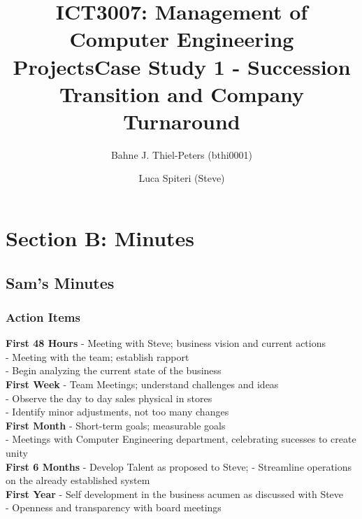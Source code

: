 \documentclass[a4paper,10pt]{article}
\title{ICT3007: Management of Computer Engineering Projects\newline \centering Case Study 1 - Succession Transition and Company Turnaround}
\author{
Bahne J. Thiel-Peters (bthi0001)
}
\begin{document}
\maketitle
\thispagestyle{empty}

\setcounter{page}{1}

\section{Section B: Minutes}

\subsection{Sam's Minutes}
\author{Luca Spiteri (Steve)}

\subsubsection{Action Items}
\textbf{First 48 Hours}
- Meeting with Steve; business vision and current actions \\
- Meeting with the team; establish rapport \\
- Begin analyzing the current state of the business \\

\textbf{First Week}
- Team Meetings; understand challenges and ideas \\
- Observe the day to day sales physical in stores \\
- Identify minor adjustments, not too many changes \\

\textbf{First Month}
- Short-term goals; measurable goals \\
- Meetings with Computer Engineering department, celebrating sucesses to create unity \\

\textbf{First 6 Months}
- Develop Talent as proposed to Steve;
- Streamline operations on the already established system \\

\textbf{First Year}
- Self development in the business acumen as discussed with Steve \\
- Openness and transparency with board meetings \\
\end{document}
